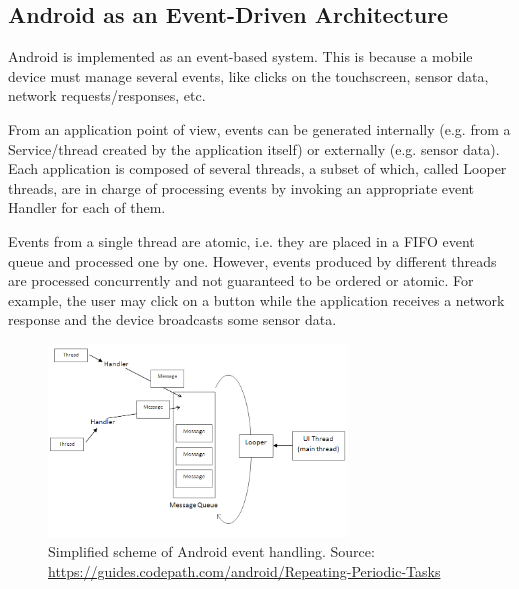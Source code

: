 \documentclass[11pt,a4paper,notitlepage]{article}
\begin{document}
\subsection{Android as an Event-Driven Architecture}
Android is implemented as an event-based system. This is because a mobile device must manage several events, like clicks on the touchscreen, sensor data, network requests/responses, etc.

From an application point of view, events can be generated internally (e.g. from a Service/thread created by the application itself) or externally (e.g. sensor data). Each application is composed of several threads, a subset of which, called Looper threads, are in charge of processing events by invoking an appropriate event Handler for each of them.

Events from a single thread are atomic, i.e. they are placed in a FIFO event queue and processed one by one. However, events produced by different threads are processed concurrently and not guaranteed to be ordered or atomic. For example, the user may click on a button while the application receives a network response and the device broadcasts some sensor data.

\begin{figure}
  \centering
  \includegraphics[width=300px]{Images/Android/event-driven.png}
  \caption[Android Event Handling]{Simplified scheme of Android event handling. Source: \url{https://guides.codepath.com/android/Repeating-Periodic-Tasks}}
\end{figure}
\end{document}
